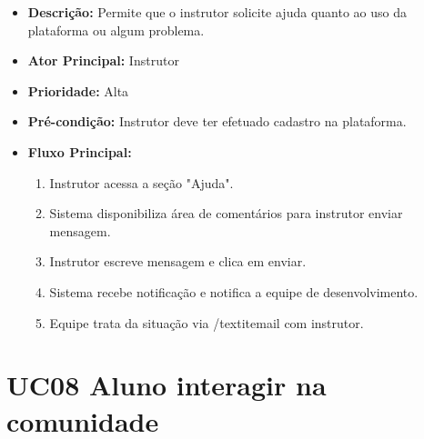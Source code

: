         \begin{itemize}
            \item \textbf{Descrição:} Permite que o instrutor solicite ajuda quanto ao uso da plataforma ou algum problema.
            
            \item \textbf{Ator Principal:} Instrutor
            
            \item \textbf{Prioridade:} Alta
            
            \item \textbf{Pré-condição:} Instrutor deve ter efetuado cadastro na plataforma.
            
            \item \textbf{Fluxo Principal:}
            \begin{enumerate}
                \item Instrutor acessa a seção "Ajuda".
                \item Sistema disponibiliza área de comentários para instrutor enviar mensagem.
                \item Instrutor escreve mensagem e clica em enviar.
                \item Sistema recebe notificação e notifica a equipe de desenvolvimento.
                \item Equipe trata da situação via /textit{email} com instrutor.
            \end{enumerate}
        \end{itemize}

        \section*{UC08 Aluno interagir na comunidade}

